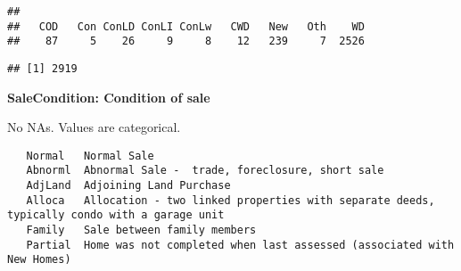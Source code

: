 \documentclass[]{article}
\newenvironment{Shaded}{\begin{snugshade}}{\end{snugshade}}
\newcommand{\CommentTok}[1]{\textcolor[rgb]{0.56,0.35,0.01}{\textit{#1}}}
\newcommand{\DecValTok}[1]{\textcolor[rgb]{0.00,0.00,0.81}{#1}}
\newcommand{\KeywordTok}[1]{\textcolor[rgb]{0.13,0.29,0.53}{\textbf{#1}}}
\newcommand{\NormalTok}[1]{#1}
\newcommand{\OperatorTok}[1]{\textcolor[rgb]{0.81,0.36,0.00}{\textbf{#1}}}
\newcommand{\StringTok}[1]{\textcolor[rgb]{0.31,0.60,0.02}{#1}}
\begin{document}
\begin{Shaded}
\end{Shaded}

\begin{verbatim}
## 
##   COD   Con ConLD ConLI ConLw   CWD   New   Oth    WD 
##    87     5    26     9     8    12   239     7  2526
\end{verbatim}

\begin{Shaded}
\end{Shaded}

\begin{verbatim}
## [1] 2919
\end{verbatim}

\textbf{SaleCondition: Condition of sale}

No NAs. Values are categorical.

\begin{verbatim}
   Normal   Normal Sale
   Abnorml  Abnormal Sale -  trade, foreclosure, short sale
   AdjLand  Adjoining Land Purchase
   Alloca   Allocation - two linked properties with separate deeds, typically condo with a garage unit  
   Family   Sale between family members
   Partial  Home was not completed when last assessed (associated with New Homes)
\end{verbatim}

\begin{Shaded}
\end{Shaded}
\end{document}
